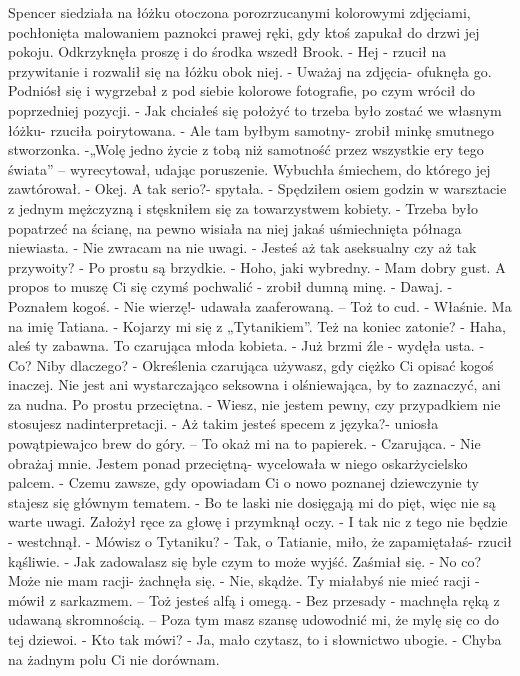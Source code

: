\documentclass[12pt,a4paper]{book}
\begin{document}
Spencer siedziała na łóżku otoczona porozrzucanymi kolorowymi zdjęciami, pochłonięta malowaniem paznokci prawej ręki, gdy ktoś zapukał do drzwi jej pokoju. Odkrzyknęła proszę i do środka wszedł Brook. 
- Hej - rzucił na przywitanie i rozwalił się na łóżku obok niej.
- Uważaj na zdjęcia- ofuknęła go. 
Podniósł się i wygrzebał z pod siebie kolorowe fotografie, po czym wrócił do poprzedniej pozycji. 
- Jak chciałeś się położyć to trzeba było zostać we własnym łóżku- rzuciła poirytowana.
- Ale tam byłbym samotny- zrobił minkę smutnego stworzonka. -„Wolę jedno życie z tobą niż samotność przez wszystkie ery tego świata” – wyrecytował, udając poruszenie. 
Wybuchła śmiechem, do którego jej zawtórował. 
- Okej. A tak serio?- spytała.
- Spędziłem osiem godzin w warsztacie z jednym mężczyzną i stęskniłem się za towarzystwem kobiety.
- Trzeba było popatrzeć na ścianę, na pewno wisiała na niej jakaś uśmiechnięta półnaga niewiasta. 
- Nie zwracam na nie uwagi.
- Jesteś aż tak aseksualny czy aż tak przywoity?
- Po prostu są brzydkie.
- Hoho, jaki wybredny. 
- Mam dobry gust. A propos to muszę Ci się czymś pochwalić - zrobił dumną minę.  
- Dawaj.
- Poznałem kogoś. 
- Nie wierzę!- udawała zaaferowaną. – Toż to cud. 
- Właśnie. Ma na imię Tatiana. 
- Kojarzy mi się z „Tytanikiem”. Też na koniec zatonie?
- Haha, aleś ty zabawna. To czarująca młoda kobieta. 
- Już brzmi źle - wydęła usta. 
- Co? Niby dlaczego?
- Określenia czarująca używasz, gdy ciężko Ci opisać kogoś inaczej. Nie jest ani wystarczająco seksowna i olśniewająca, by to zaznaczyć, ani za nudna. Po prostu przeciętna. 
- Wiesz, nie jestem pewny, czy przypadkiem nie stosujesz nadinterpretacji. 
- Aż takim jesteś specem z języka?- uniosła powątpiewajco brew do góry. – To okaż mi na to papierek. 
- Czarująca. 
- Nie obrażaj mnie. Jestem ponad przeciętną- wycelowała w niego oskarżycielsko palcem. 
- Czemu zawsze, gdy opowiadam Ci o nowo poznanej dziewczynie ty stajesz się głównym tematem. 
- Bo te laski nie dosięgają mi do pięt, więc nie są warte uwagi. 
Założył ręce za głowę i przymknął oczy.
- I tak nic z tego nie będzie - westchnął. 
- Mówisz o Tytaniku?
- Tak, o Tatianie, miło, że zapamiętałaś- rzucił kąśliwie. 
- Jak zadowalasz się byle czym to może wyjść.
Zaśmiał się. 
- No co? Może nie mam racji- żachnęła się. 
- Nie, skądże. Ty miałabyś nie mieć racji - mówił z sarkazmem. – Toż jesteś alfą i omegą. 
- Bez przesady - machnęła ręką z udawaną skromnością. – Poza tym masz szansę udowodnić mi, że mylę się co do tej dziewoi. 
-  Kto tak mówi? 
 - Ja, mało czytasz, to i słownictwo ubogie. 
- Chyba na żadnym polu Ci nie dorównam. 
\end{document}
